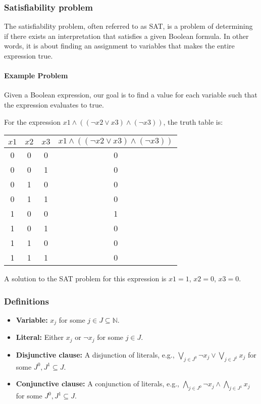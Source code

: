 \documentclass[12pt]{article}
\begin{document}


\subsubsection{Satisfiability problem}
The satisfiability problem, often referred to as SAT, is a problem of determining if there exists an interpretation that satisfies a given Boolean formula. In other words, it is about finding an assignment to variables that makes the entire expression true.


\paragraph{Example Problem}
Given a Boolean expression, our goal is to find a value for each variable such that the expression evaluates to true.

For the expression \(x1 \land ((\neg x2 \lor x3) \land (\neg x3))\), the truth table is:

\begin{center}
\begin{tabular}{ccc|c}
$x1$ & $x2$ & $x3$ & $x1 \land ((\neg x2 \lor x3) \land (\neg x3))$ \\
\hline
0 & 0 & 0 & 0 \\
0 & 0 & 1 & 0 \\
0 & 1 & 0 & 0 \\
0 & 1 & 1 & 0 \\
1 & 0 & 0 & 1 \\
1 & 0 & 1 & 0 \\
1 & 1 & 0 & 0 \\
1 & 1 & 1 & 0 \\
\end{tabular}
\end{center}

A solution to the SAT problem for this expression is \(x1 = 1\), \(x2 = 0\), \(x3 = 0\).

\subsubsection{Definitions}
\begin{itemize}
\item \textbf{Variable:} \(x_j\) for some \(j \in J \subseteq \mathbb{N}\).
\item \textbf{Literal:} Either \(x_j\) or \(\neg x_j\) for some \(j \in J\).
\item \textbf{Disjunctive clause:} A disjunction of literals, e.g., \(\bigvee_{j \in J^0} \neg x_j \lor \bigvee_{j \in J^1} x_j\) for some \(J^0, J^1 \subseteq J\).
\item \textbf{Conjunctive clause:} A conjunction of literals, e.g., \(\bigwedge_{j \in J^0} \neg x_j \land \bigwedge_{j \in J^1} x_j\) for some \(J^0, J^1 \subseteq J\).
\end{itemize}
\end{document}
